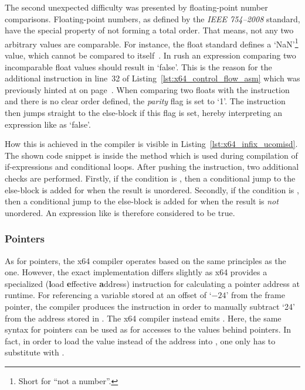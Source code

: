 The second unexpected difficulty was presented by floating-point number comparisons.
Floating-point numbers, as defined by the \emph{IEEE 754--2008} standard, have the special property of not forming a total order.
That means, not any two arbitrary values are comparable.
For instance, the float standard defines a `NaN'\footnote{Short for ``not a number''.} value, which cannot be compared to itself~\cite[pp.~215f]{Patterson2017-zq}.
In rush an expression comparing two incomparable float values should result in `false'.
This is the reason for the additional  instruction in line~32 of Listing~\ref{lst:x64_control_flow_asm} which was previously hinted at on page~\pageref{x64_ucomisd}.
When comparing two floats with the  instruction and there is no clear order defined, the \emph{parity} flag is set to `1'.
The  instruction then jumps straight to the else-block if this flag is set, hereby interpreting an expression like  as `false'.


How this is achieved in the compiler is visible in Listing~\ref{lst:x64_infix_ucomisd}.
The shown code snippet is inside the  method which is used during compilation of if-expressions and conditional loops.
After pushing the  instruction, two additional checks are performed.
Firstly, if the condition is \qVerb{==}, then a conditional jump to the else-block is added for when the result is unordered.
Secondly, if the condition is \qVerb{!=}, then a conditional jump to the else-block is added for when the result is \emph{not} unordered.
An expression like  is therefore considered to be true.

\subsubsection{Pointers}

As for pointers, the x64 compiler operates based on the same principles as the \riscv{} one.
However, the exact implementation differs slightly as x64 provides a specialized  (\textbf{l}oad \textbf{e}ffective \textbf{a}ddress) instruction for calculating a pointer address at runtime.
For referencing a variable stored at an offset of `$-24$' from the frame pointer, the \riscv{} compiler produces the instruction  in order to manually subtract `24' from the address stored in .
The x64 compiler instead emits .
Here, the same syntax for pointers can be used as for accesses to the values behind pointers.
In fact, in order to load the value instead of the address into , one only has to substitute  with .
